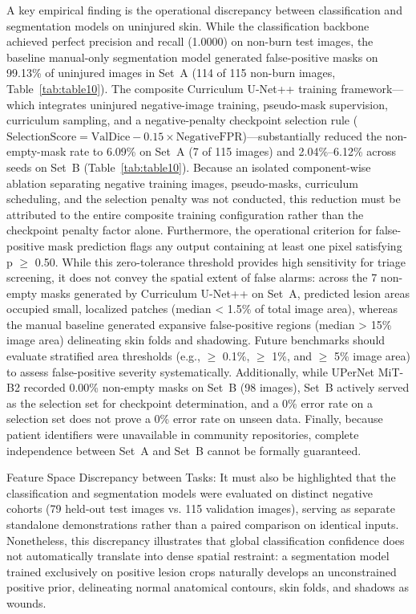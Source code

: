 \documentclass[11pt,a4paper]{article}
\begin{document}
A key empirical finding is the operational discrepancy between classification and segmentation models on uninjured skin. While the classification backbone achieved perfect precision and recall (1.0000) on non-burn test images, the baseline manual-only segmentation model generated false-positive masks on 99.13\% of uninjured images in Set~A (114 of 115 non-burn images, Table~\ref{tab:table10}). The composite Curriculum U-Net++ training framework---which integrates uninjured negative-image training, pseudo-mask supervision, curriculum sampling, and a negative-penalty checkpoint selection rule ($\text{SelectionScore} = \text{ValDice} - 0.15 \times \text{NegativeFPR}$)---substantially reduced the non-empty-mask rate to 6.09\% on Set~A (7 of 115 images) and 2.04\%--6.12\% across seeds on Set~B (Table~\ref{tab:table10}). Because an isolated component-wise ablation separating negative training images, pseudo-masks, curriculum scheduling, and the selection penalty was not conducted, this reduction must be attributed to the entire composite training configuration rather than the checkpoint penalty factor alone. Furthermore, the operational criterion for false-positive mask prediction flags any output containing at least one pixel satisfying p $\ge$ 0.50. While this zero-tolerance threshold provides high sensitivity for triage screening, it does not convey the spatial extent of false alarms: across the 7 non-empty masks generated by Curriculum U-Net++ on Set~A, predicted lesion areas occupied small, localized patches (median < 1.5\% of total image area), whereas the manual baseline generated expansive false-positive regions (median > 15\% image area) delineating skin folds and shadowing. Future benchmarks should evaluate stratified area thresholds (e.g., $\ge$ 0.1\%, $\ge$ 1\%, and $\ge$ 5\% image area) to assess false-positive severity systematically. Additionally, while UPerNet MiT-B2 recorded 0.00\% non-empty masks on Set~B (98 images), Set~B actively served as the selection set for checkpoint determination, and a 0\% error rate on a selection set does not prove a 0\% error rate on unseen data. Finally, because patient identifiers were unavailable in community repositories, complete independence between Set~A and Set~B cannot be formally guaranteed.

Feature Space Discrepancy between Tasks: It must also be highlighted that the classification and segmentation models were evaluated on distinct negative cohorts (79 held-out test images vs. 115 validation images), serving as separate standalone demonstrations rather than a paired comparison on identical inputs. Nonetheless, this discrepancy illustrates that global classification confidence does not automatically translate into dense spatial restraint: a segmentation model trained exclusively on positive lesion crops naturally develops an unconstrained positive prior, delineating normal anatomical contours, skin folds, and shadows as wounds.
\end{document}
